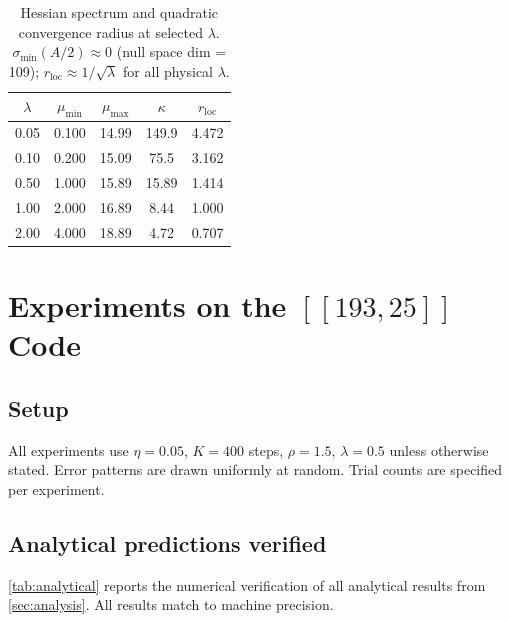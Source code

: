 \documentclass[12pt,a4paper]{article}
\theoremstyle{plain}
\theoremstyle{definition}
\theoremstyle{remark}
\begin{document}
\begin{table}[ht]
\centering
\caption{Hessian spectrum and quadratic convergence radius at selected $\lambda$.
  $\sigma_{\min}(A/2) \approx 0$ (null space dim = 109);
  $r_{\mathrm{loc}} \approx 1/\sqrt{\lambda}$ for all physical $\lambda$.}
\label{tab:spectrum}
\small
\begin{tabular}{ccccc}
\toprule
$\lambda$ & $\mu_{\min}$ & $\mu_{\max}$ & $\kappa$ & $r_{\mathrm{loc}}$ \\
\midrule
0.05 & 0.100 & 14.99 & 149.9 & 4.472 \\
0.10 & 0.200 & 15.09 & 75.5 & 3.162 \\
0.50 & 1.000 & 15.89 & 15.89 & 1.414 \\
1.00 & 2.000 & 16.89 & 8.44 & 1.000 \\
2.00 & 4.000 & 18.89 & 4.72 & 0.707 \\
\bottomrule
\end{tabular}
\end{table}

\section{Experiments on the $[[193,25]]$ Code}\label{sec:experiments}

\subsection{Setup}

All experiments use $\eta = 0.05$, $K = 400$ steps, $\rho = 1.5$, $\lambda = 0.5$
unless otherwise stated.
Error patterns are drawn uniformly at random.
Trial counts are specified per experiment.

\subsection{Analytical predictions verified}

\cref{tab:analytical} reports the numerical verification of all analytical
results from \cref{sec:analysis}.
All results match to machine precision.
\end{document}
